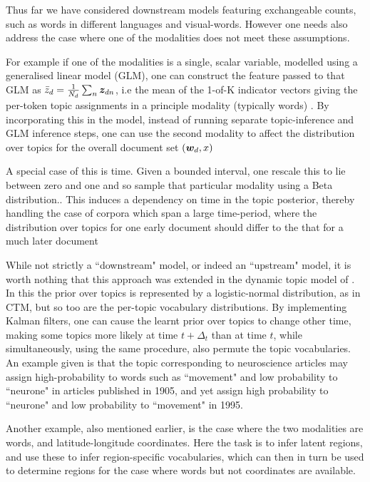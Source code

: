 Thus far we have considered downstream models featuring exchangeable counts, such as words in different languages and visual-words. However one needs also address the case where one of the modalities does not meet these assumptions.

For example if one of the modalities is a single, scalar variable, modelled using a generalised linear model (GLM), one can construct the feature passed to that GLM as $\bar{z}_d = \frac{1}{N_d} \sum_n \bm z_{dn}$, i.e the mean of the 1-of-K indicator vectors giving the per-token topic assignments in a principle modality (typically words) \cite{Blei2008}. By incorporating this in the model, instead of running separate topic-inference and GLM inference steps, one can use the second modality to affect the distribution over topics for the overall document set $({ \bm w_d }, x)$

A special case of this is time. Given a bounded interval, one rescale this to lie between zero and one and so sample that particular modality using a Beta distribution.\cite{Wang2006}. This induces a dependency on time in the topic posterior, thereby handling the case of corpora which span a large time-period, where the distribution over topics for one early document should differ to the that for a much later document

While not strictly a ``downstream" model, or indeed an ``upstream" model, it is worth nothing that this approach was extended in the dynamic topic model of \cite{Blei2006a}. In this the prior over topics is represented by a logistic-normal distribution, as in CTM, but so too are the per-topic vocabulary distributions. By implementing Kalman filters, one can cause the learnt prior over topics to change other time, making some topics more likely at time $t + \Delta_t$ than at time $t$, while simultaneously, using the same procedure, also permute the topic vocabularies. An example given is that the topic corresponding to neuroscience articles may assign high-probability to words such as ``movement" and low probability to ``neurone" in articles published in 1905, and yet assign high probability to ``neurone" and low probability to ``movement" in 1995.

Another example, also mentioned earlier, is the case where the two modalities are words, and latitude-longitude coordinates\cite{Eisenstein2010}. Here the task is to infer latent regions, and use these to infer region-specific vocabularies, which can then in turn be used to determine regions for the case where words but not coordinates are available.

